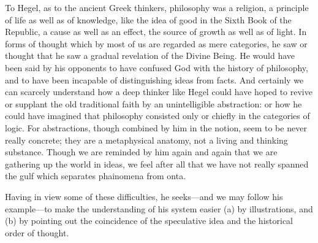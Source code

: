 \documentclass[11pt,letter]{article}
\begin{document}
\par  To Hegel, as to the ancient Greek thinkers, philosophy was a religion, a principle of life as well as of knowledge, like the idea of good in the Sixth Book of the Republic, a cause as well as an effect, the source of growth as well as of light. In forms of thought which by most of us are regarded as mere categories, he saw or thought that he saw a gradual revelation of the Divine Being. He would have been said by his opponents to have confused God with the history of philosophy, and to have been incapable of distinguishing ideas from facts. And certainly we can scarcely understand how a deep thinker like Hegel could have hoped to revive or supplant the old traditional faith by an unintelligible abstraction: or how he could have imagined that philosophy consisted only or chiefly in the categories of logic. For abstractions, though combined by him in the notion, seem to be never really concrete; they are a metaphysical anatomy, not a living and thinking substance. Though we are reminded by him again and again that we are gathering up the world in ideas, we feel after all that we have not really spanned the gulf which separates phainomena from onta.

\par  Having in view some of these difficulties, he seeks—and we may follow his example—to make the understanding of his system easier (a) by illustrations, and (b) by pointing out the coincidence of the speculative idea and the historical order of thought.
\end{document}
